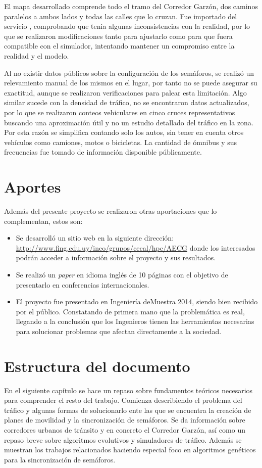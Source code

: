El mapa desarrollado comprende todo el tramo del Corredor Garzón, dos caminos paralelos a ambos lados y todas las calles que lo cruzan. Fue importado del servicio \citep{OSM}, comprobando que tenia algunas inconsistencias con la realidad, por lo que se realizaron modificaciones tanto para ajustarlo como para que fuera compatible con el simulador, intentando mantener un compromiso entre la realidad y el modelo. 

Al no existir datos públicos sobre la configuración de los semáforos, se realizó un relevamiento manual de los mismos en el lugar, por tanto no se puede asegurar su exactitud, aunque se realizaron verificaciones para palear esta limitación. Algo similar sucede con la densidad de tráfico, no se encontraron datos actualizados, por lo que se realizaron conteos vehiculares en cinco cruces representativos buscando una aproximación útil y no un estudio detallado del tráfico en la zona. Por esta razón se simplifica contando solo los autos, sin tener en cuenta otros vehículos como camiones, motos o bicicletas. La cantidad de ómnibus y sus frecuencias fue tomado de información disponible públicamente.


\section{Aportes}
Además del presente proyecto se realizaron otras aportaciones que lo complementan, estos son: 
\begin{itemize}
	\item Se desarrolló un sitio web en la siguiente dirección: \url{http://www.fing.edu.uy/inco/grupos/cecal/hpc/AECG} donde los interesados podrán acceder a información sobre el proyecto y sus resultados. 
	\item Se realizó un \emph{paper} en idioma inglés de 10 páginas con el objetivo de presentarlo en conferencias internacionales.
	\item El proyecto fue presentado en Ingeniería deMuestra 2014, siendo bien recibido por el público. Constatando de primera mano que la problemática es real, llegando a la conclusión que los Ingenieros tienen las herramientas necesarias para solucionar problemas que afectan directamente a la sociedad.
\end{itemize}

\section{Estructura del documento}
En el siguiente capítulo se hace un repaso sobre fundamentos teóricos necesarios para comprender el resto del trabajo. Comienza describiendo el problema del tráfico y algunas formas de solucionarlo ente las que se encuentra la creación de planes de movilidad y la sincronización de semáforos. Se da información sobre corredores urbanos de tránsito y en concreto el Corredor Garzón, así como un repaso breve sobre algoritmos evolutivos y simuladores de tráfico. Además se muestran los trabajos relacionados haciendo especial foco en algoritmos genéticos para la sincronización de semáforos.

